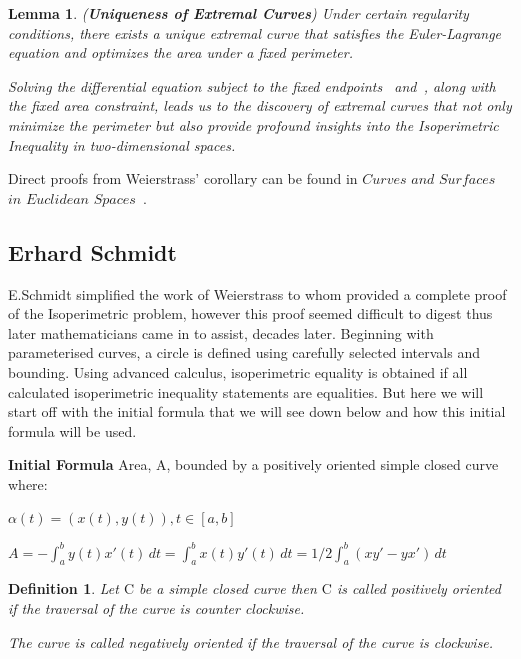 \documentclass[a4paper]{book}
\newtheorem{lemma}[theorem]{Lemma}%
\newtheorem{definition}[theorem]{Definition}%
\numberwithin{theorem}{section}%
\begin{document}
    \begin{lemma}(\textbf{Uniqueness of Extremal Curves})
        Under certain regularity conditions, there exists a unique extremal curve that satisfies the Euler-Lagrange equation and optimizes the area under a fixed perimeter.

        Solving the differential equation subject to the fixed endpoints~\citep{goldstein1980classical} and~\citep{hilbert1985methods}, along with the fixed area constraint, leads us to the discovery of extremal curves that not only minimize the perimeter but also provide profound insights into the Isoperimetric Inequality in two-dimensional spaces.
    \end{lemma}
Direct proofs from Weierstrass' corollary can be found in $Curves$ $and$ $Surfaces$ $in$ $Euclidean$ $Spaces$~\citep{chern1966curves}.

\subsection{Erhard Schmidt}
E.Schmidt simplified the work of Weierstrass to whom provided a complete proof of the Isoperimetric problem, however this proof seemed difficult to digest thus later mathematicians came in to assist, decades later. Beginning with parameterised curves, a circle is defined using carefully selected intervals and bounding. Using advanced calculus, isoperimetric equality is obtained if all calculated isoperimetric inequality statements are equalities. But here we will start off with the initial formula that we will see down below and how this initial formula will be used.

\textbf{Initial Formula}
Area, A, bounded by a positively oriented simple closed curve where: 
\begin{center}
	$\alpha(t)=(x(t),y(t)), t\in [a,b]$
\end{center}
\begin{center}
	$A=-\int_{a}^{b}y(t)x'(t)\,dt=\int_{a}^{b}x(t)y'(t)\,dt = 1/2\int_{a}^{b}(xy'-yx')\,dt$
\end{center}

\begin{definition}
    Let $\mathrm{C}$ be a simple closed curve then $\mathrm{C}$ is called positively oriented if the traversal of the curve is counter clockwise.

    The curve is called negatively oriented if the traversal of the curve is clockwise. 
\end{definition}
\end{document}
